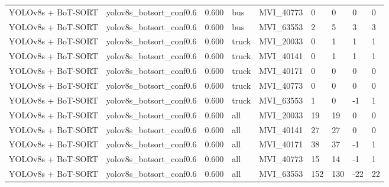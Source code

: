 \begin{tabular}{lllllllll}
YOLOv8s + BoT-SORT & yolov8s\_botsort\_conf0.6 & 0.600 & bus & MVI\_40773 & 0 & 0 & 0 & 0 \\
YOLOv8s + BoT-SORT & yolov8s\_botsort\_conf0.6 & 0.600 & bus & MVI\_63553 & 2 & 5 & 3 & 3 \\
YOLOv8s + BoT-SORT & yolov8s\_botsort\_conf0.6 & 0.600 & truck & MVI\_20033 & 0 & 1 & 1 & 1 \\
YOLOv8s + BoT-SORT & yolov8s\_botsort\_conf0.6 & 0.600 & truck & MVI\_40141 & 0 & 1 & 1 & 1 \\
YOLOv8s + BoT-SORT & yolov8s\_botsort\_conf0.6 & 0.600 & truck & MVI\_40171 & 0 & 0 & 0 & 0 \\
YOLOv8s + BoT-SORT & yolov8s\_botsort\_conf0.6 & 0.600 & truck & MVI\_40773 & 0 & 0 & 0 & 0 \\
YOLOv8s + BoT-SORT & yolov8s\_botsort\_conf0.6 & 0.600 & truck & MVI\_63553 & 1 & 0 & -1 & 1 \\
YOLOv8s + BoT-SORT & yolov8s\_botsort\_conf0.6 & 0.600 & all & MVI\_20033 & 19 & 19 & 0 & 0 \\
YOLOv8s + BoT-SORT & yolov8s\_botsort\_conf0.6 & 0.600 & all & MVI\_40141 & 27 & 27 & 0 & 0 \\
YOLOv8s + BoT-SORT & yolov8s\_botsort\_conf0.6 & 0.600 & all & MVI\_40171 & 38 & 37 & -1 & 1 \\
YOLOv8s + BoT-SORT & yolov8s\_botsort\_conf0.6 & 0.600 & all & MVI\_40773 & 15 & 14 & -1 & 1 \\
YOLOv8s + BoT-SORT & yolov8s\_botsort\_conf0.6 & 0.600 & all & MVI\_63553 & 152 & 130 & -22 & 22 \\
\bottomrule
\end{tabular}
